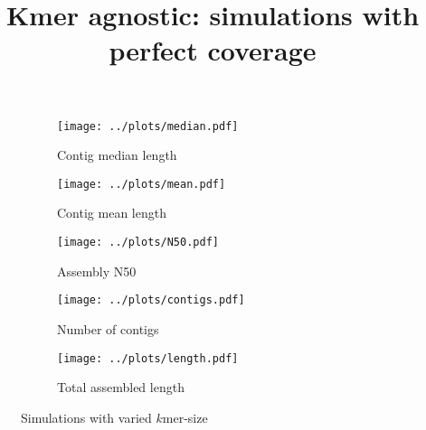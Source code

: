 \documentclass{article}
\title{Kmer agnostic: simulations with perfect coverage}
\begin{document}
\begin{figure}[ht]
\begin{subfigure}{.5\textwidth}
  \centering
  \caption{Contig median length}
  \texttt{[image: ../plots/median.pdf]}
\end{subfigure}
\begin{subfigure}{.5\textwidth}
  \centering
  \caption{Contig mean length}
  \texttt{[image: ../plots/mean.pdf]}
\end{subfigure}
\begin{subfigure}{.5\textwidth}
  \centering
  \caption{Assembly N50}
  \texttt{[image: ../plots/N50.pdf]}
\end{subfigure}
\begin{subfigure}{.5\textwidth}
  \centering
  \caption{Number of contigs}
  \texttt{[image: ../plots/contigs.pdf]}
\end{subfigure}
\begin{subfigure}{.5\textwidth}
  \centering
  \caption{Total assembled length}
  \texttt{[image: ../plots/length.pdf]}
\end{subfigure}
\caption{Simulations with varied $k$mer-size}
\label{fig:kmer_agnostic}
\end{figure}
\end{document}
